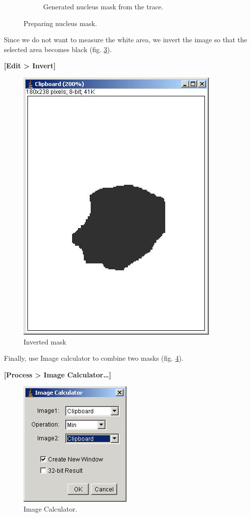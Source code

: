 \documentclass{article}
\begin{document}
\begin{figure}[!ht]
\begin{subfigure}{.5\textwidth}
  \caption{Generated nucleus mask from the trace.}
  \label{fig:nucMask}
\end{subfigure}
\caption{Preparing nucleus mask.}
\label{fig:nucmaskCreation}
\end{figure}


Since we do not want to measure the white area, we invert the image so
that the selected area becomes black (fig. \ref{fig:invmask}).

\textbf{{[}Edit \textgreater{} Invert{]}}

\begin{figure}[htbp]
\centering
\includegraphics[scale=0.5]{img/cellnuctrace_bw_inv.jpg}
\caption{Inverted mask}
\label{fig:invmask}
\end{figure}

Finally, use Image calculator to combine two masks (fig. \ref{fig:imgcalcGUI}).

\textbf{{[}Process \textgreater{} Image Calculator\ldots{}{]}}

\begin{figure}[htbp]
\centering
\includegraphics[scale=0.7]{img/imageCalculator.jpg}
\caption{Image Calculator.}
\label{fig:imgcalcGUI}
\end{figure}
\end{document}
